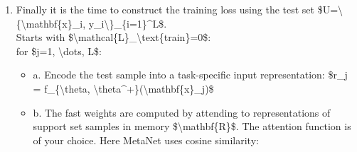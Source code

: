 \begin{enumerate}
  \begin{itemize}
  \tightlist
  \item
    a. The base learner outputs a probability distribution: \$P(\textbackslash hat\{y\}\_i \textbackslash vert \textbackslash mathbf\{x\}\_i) = g\_\textbackslash phi(\textbackslash mathbf\{x\}\_i)\$ and the loss can be cross-entropy or MSE: \$\textbackslash mathcal\{L\}\^{}\textbackslash text\{task\}\_i = y'\_i \textbackslash log g\_\textbackslash phi(\textbackslash mathbf\{x\}'\_i) + (1- y'\_i) \textbackslash log (1 - g\_\textbackslash phi(\textbackslash mathbf\{x\}'\_i))\$
  \item
    b. Extract meta information (loss gradients) of the task and compute the example-level fast weights: \$\textbackslash phi\_i\^{}+ = G\_v(\textbackslash nabla\_\textbackslash phi\textbackslash mathcal\{L\}\^{}\textbackslash text\{task\}\_i)\$

    \begin{itemize}
    \tightlist
    \item
      Then store \$\textbackslash phi\^{}+\_i\$ into \$i\$-th location of the ``value'' memory \$\textbackslash mathbf\{M\}\$.\\
    \end{itemize}
  \item
    d. Encode the support sample into a task-specific input representation using both slow and fast weights: \$r'\_i = f\_\{\textbackslash theta, \textbackslash theta\^{}+\}(\textbackslash mathbf\{x\}'\_i)\$

    \begin{itemize}
    \tightlist
    \item
      Then store \$r'\_i\$ into \$i\$-th location of the ``key'' memory \$\textbackslash mathbf\{R\}\$.
    \end{itemize}
  \end{itemize}
\item
  Finally it is the time to construct the training loss using the test set \$U=\textbackslash\{\textbackslash mathbf\{x\}\_i, y\_i\textbackslash\}\_\{i=1\}\^{}L\$.\\
  Starts with \$\textbackslash mathcal\{L\}\_\textbackslash text\{train\}=0\$:\\
  for \$j=1, \textbackslash dots, L\$:

  \begin{itemize}
  \tightlist
  \item
    a. Encode the test sample into a task-specific input representation: \$r\_j = f\_\{\textbackslash theta, \textbackslash theta\^{}+\}(\textbackslash mathbf\{x\}\_j)\$
  \item
    b. The fast weights are computed by attending to representations of support set samples in memory \$\textbackslash mathbf\{R\}\$. The attention function is of your choice. Here MetaNet uses cosine similarity:\\
  \end{itemize}


\end{enumerate}
